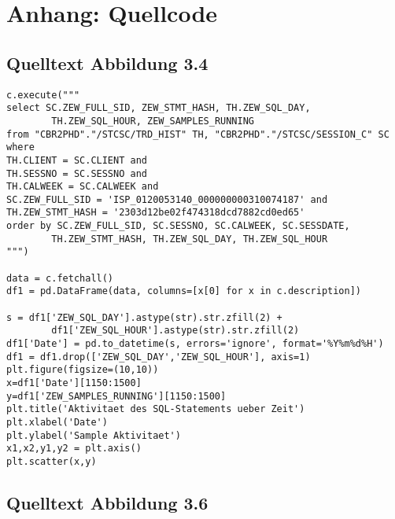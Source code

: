 \chapter{Anhang: Quellcode}

\section{Quelltext Abbildung 3.4}

\begin{lstlisting}[caption={\texttt{Quelltext Abbildung 3.3}},captionpos=b]
c.execute("""
select SC.ZEW_FULL_SID, ZEW_STMT_HASH, TH.ZEW_SQL_DAY, 
		TH.ZEW_SQL_HOUR, ZEW_SAMPLES_RUNNING
from "CBR2PHD"."/STCSC/TRD_HIST" TH, "CBR2PHD"."/STCSC/SESSION_C" SC
where
TH.CLIENT = SC.CLIENT and
TH.SESSNO = SC.SESSNO and
TH.CALWEEK = SC.CALWEEK and
SC.ZEW_FULL_SID = 'ISP_0120053140_000000000310074187' and
TH.ZEW_STMT_HASH = '2303d12be02f474318dcd7882cd0ed65'
order by SC.ZEW_FULL_SID, SC.SESSNO, SC.CALWEEK, SC.SESSDATE, 
		TH.ZEW_STMT_HASH, TH.ZEW_SQL_DAY, TH.ZEW_SQL_HOUR
""")

data = c.fetchall()
df1 = pd.DataFrame(data, columns=[x[0] for x in c.description])

s = df1['ZEW_SQL_DAY'].astype(str).str.zfill(2) + 
		df1['ZEW_SQL_HOUR'].astype(str).str.zfill(2)
df1['Date'] = pd.to_datetime(s, errors='ignore', format='%Y%m%d%H')
df1 = df1.drop(['ZEW_SQL_DAY','ZEW_SQL_HOUR'], axis=1)	
plt.figure(figsize=(10,10))
x=df1['Date'][1150:1500]
y=df1['ZEW_SAMPLES_RUNNING'][1150:1500]
plt.title('Aktivitaet des SQL-Statements ueber Zeit')
plt.xlabel('Date')
plt.ylabel('Sample Aktivitaet')
x1,x2,y1,y2 = plt.axis()  
plt.scatter(x,y)
\end{lstlisting}


\section{Quelltext Abbildung 3.6}

